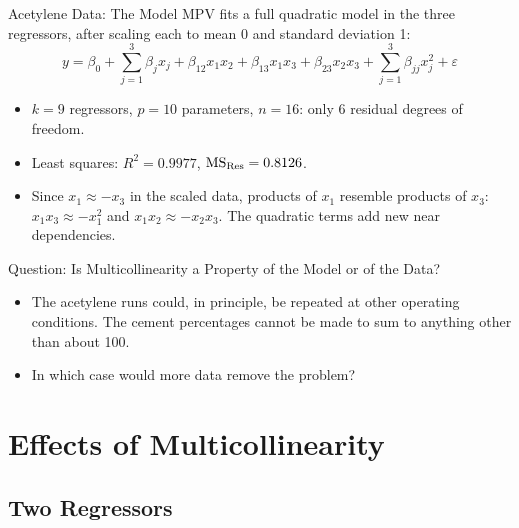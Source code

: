 \begin{frame}{Acetylene Data: The Model}
    MPV fits a full quadratic model in the three regressors, after scaling each to mean 0 and standard deviation 1:
    \[
    y=\beta_0+\sum_{j=1}^3\beta_jx_j+\beta_{12}x_1x_2+\beta_{13}x_1x_3+\beta_{23}x_2x_3+\sum_{j=1}^3\beta_{jj}x_j^2+\varepsilon
    \]
    \begin{itemize}
        \item $k=9$ regressors, $p=10$ parameters, $n=16$: only 6 residual degrees of freedom.
        \item Least squares: $R^2=0.9977$, $\mathrm{MS}_{\mathrm{Res}}=0.8126$.
        \item Since $x_1\approx-x_3$ in the scaled data, products of $x_1$ resemble products of $x_3$: $x_1x_3\approx-x_1^2$ and $x_1x_2\approx-x_2x_3$. The quadratic terms add new near dependencies.
    \end{itemize}
\end{frame}


\begin{frame}{Question: Is Multicollinearity a Property of the Model or of the Data?}
    \begin{itemize}
        \item The acetylene runs could, in principle, be repeated at other operating conditions. The cement percentages cannot be made to sum to anything other than about 100.
        \item In which case would more data remove the problem?
    \end{itemize}
\end{frame}


\section{Effects of Multicollinearity}


\subsection{Two Regressors}


